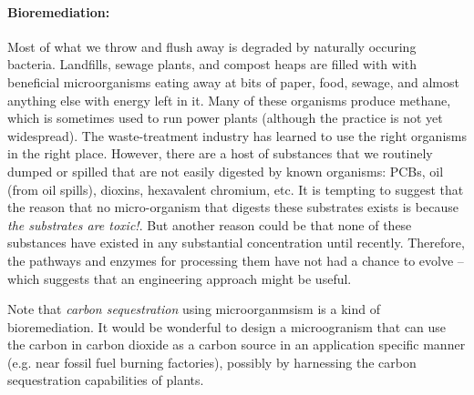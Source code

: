 
\paragraph{Bioremediation:} Most of what we throw and flush away is
degraded by naturally occuring bacteria. Landfills, sewage plants, and
compost heaps are filled with with beneficial microorganisms eating
away at bits of paper, food, sewage, and almost anything else with
energy left in it. Many of these organisms produce methane, which is
sometimes used to run power plants (although the practice is not yet
widespread). The waste-treatment industry has learned to use the right
organisms in the right place. However, there are a host of substances
that we routinely dumped or spilled that are not easily digested by
known organisms: PCBs, oil (from oil spills), dioxins, hexavalent
chromium, etc. It is tempting to suggest that the reason that no
micro-organism that digests these substrates exists is because {\em
  the substrates are toxic!}. But another reason could be that none of
these substances have existed in any substantial concentration until
recently. Therefore, the pathways and enzymes for processing them have
not had a chance to evolve -- which suggests that an engineering
approach might be useful. 

Note that {\em carbon sequestration} using microorganmsism is a kind
of bioremediation. It would be wonderful to design a microogranism
that can use the carbon in carbon dioxide as a carbon source in an
application specific manner (e.g. near fossil fuel burning factories),
possibly by harnessing the carbon sequestration capabilities of plants.

